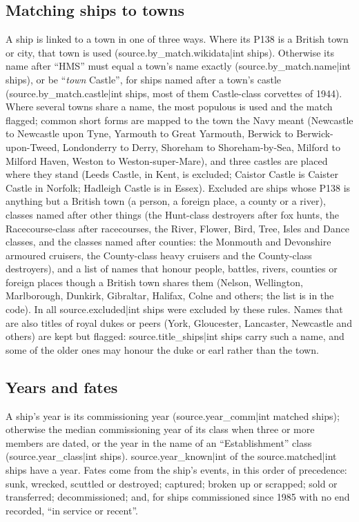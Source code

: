 \documentclass[11pt,a4paper]{article}
\begin{document}
\subsection{Matching ships to towns}
A ship is linked to a town in one of three ways. Where its P138 is a British town or city, that town is used ({{source.by_match.wikidata|int}} ships). Otherwise its name after ``HMS'' must equal a town's name exactly ({{source.by_match.name|int}} ships), or be ``\textit{town} Castle'', for ships named after a town's castle ({{source.by_match.castle|int}} ships, most of them Castle-class corvettes of 1944). Where several towns share a name, the most populous is used and the match flagged; common short forms are mapped to the town the Navy meant (Newcastle to Newcastle upon Tyne, Yarmouth to Great Yarmouth, Berwick to Berwick-upon-Tweed, Londonderry to Derry, Shoreham to Shoreham-by-Sea, Milford to Milford Haven, Weston to Weston-super-Mare), and three castles are placed where they stand (Leeds Castle, in Kent, is excluded; Caistor Castle is Caister Castle in Norfolk; Hadleigh Castle is in Essex). Excluded are ships whose P138 is anything but a British town (a person, a foreign place, a county or a river), classes named after other things (the Hunt-class destroyers after fox hunts, the Racecourse-class after racecourses, the River, Flower, Bird, Tree, Isles and Dance classes, and the classes named after counties: the Monmouth and Devonshire armoured cruisers, the County-class heavy cruisers and the County-class destroyers), and a list of names that honour people, battles, rivers, counties or foreign places though a British town shares them (Nelson, Wellington, Marlborough, Dunkirk, Gibraltar, Halifax, Colne and others; the list is in the code). In all {{source.excluded|int}} ships were excluded by these rules. Names that are also titles of royal dukes or peers (York, Gloucester, Lancaster, Newcastle and others) are kept but flagged: {{source.title_ships|int}} ships carry such a name, and some of the older ones may honour the duke or earl rather than the town.

\subsection{Years and fates}
A ship's year is its commissioning year ({{source.year_comm|int}} matched ships); otherwise the median commissioning year of its class when three or more members are dated, or the year in the name of an ``Establishment'' class ({{source.year_class|int}} ships). {{source.year_known|int}} of the {{source.matched|int}} ships have a year. Fates come from the ship's events, in this order of precedence: sunk, wrecked, scuttled or destroyed; captured; broken up or scrapped; sold or transferred; decommissioned; and, for ships commissioned since 1985 with no end recorded, ``in service or recent''.
\end{document}

